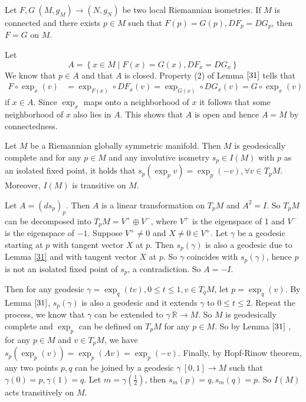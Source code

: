 \eproof
\begin{corollary}\label{11.2}
Let $F, G\:\left( M, g_{M} \right) \rightarrow \left( N, g_{N}
\right)$ be two local Riemannian isometries. If $M$ is connected
and there exists $p \in M$ such that $F(p) = G(p), D F_{p} = D
G_{p}$, then
$F=G$ on $M$.	
\end{corollary}
\bproof
Let
\[
A=\left\{ x \in M \mid F(x) = G(x), D F_{x} = D G_{x} \right\}
\]
We know that $p \in A$ and that $A$ is closed. Property (2) of
Lemma $\ref{31}$ tells
that
\[
\begin{aligned}
	F \circ \exp _{x}(v) & = \exp _{F(x)} \circ D F_{x}(v) =\exp
	_{G(x)} \circ D G_{x}(v) = G \circ \exp _{x}(v)
\end{aligned}
\]
if $x \in A$. Since $\exp _{x}$ maps onto a neighborhood of $x$
it follows that some
neighborhood of $x$ also lies in $A$. This shows that $A$ is open
and hence 
$A=M$ by connectedness.
\eproof

\begin{theorem}
	Let $M$ be a Riemannian globally symmetric manifold. Then $M$
	is geodesically complete and for any $p \in M$ and any
	involutive isometry $s_{p} \in I(M)$ with $p$ as an isolated
	fixed point, it holds that $s_{p}\left( \exp _{p} v
	\right)=\exp _{p}(-v), \forall v \in T_{p} M$.
	Moreover, $I(M)$ is transitive on $M$.
\end{theorem}
\bproof
Let $A=\left( d s_{p} \right)_{p}$. Then $A$ is a linear
transformation on $T_{p} M$ and $A^{2}=I$. So $T_{p} M$ can be
decomposed into $T_{p} M = V^{+} \oplus V^{-}$, where $V^{+}$ is
the eigenspace of 1 and $V^{-}$ is the eigenspace of $-1 .$
Suppose $V^{+} \neq 0$ and
$X \neq 0 \in V^{+}$. Let $\gamma$ be a geodesic starting at $p$
with tangent vector $X$ at $p$.
Then $s_{p}(\gamma)$ is also a geodesic due to Lemma \ref{31} and
with tangent vector $X$ at $p$. So $\gamma$ coincides with
$s_{p}(\gamma)$, hence $p$ is not an isolated fixed point of
$s_{p}$,
a contradiction. So $A=-I .$

Then for any geodesic $\gamma = \exp _{q}(t v), 0 \leq t \leq 1,
v \in T_{q} M$, let $p = \exp _{q}(v) .$ By
Lemma $\ref{31}$, $s_{p}(\gamma)$ is also a geodesic and it
extends $\gamma$ to $0 \leq t \leq 2$. Repeat the process, we
know that $\gamma$ can be extended to $\gamma\: \mathbb{R}
\rightarrow M .$ So $M$ is geodesically complete and $\exp _{p}$
can be defined on $T_{p} M$ for any $p \in M$. So by Lemma
$\ref{31}$ , for any $p \in M$ and $v \in T_{p} M$, we have
$s_{p}\left( \exp _{p}(v) \right)=\exp _{p}(A v)=\exp _{p}(-v)$.
Finally, by Hopf-Rinow theorem, any two points $p, q$ can be
joined by a geodesic $\gamma\:[0,1] \rightarrow M$ such that
$\gamma(0) = p, \gamma(1) = q$. Let $m=\gamma\left( \frac{1}{2}
\right)$, then $s_{m}(p)=q, s_{m}(q)=p .$ So $I(M)$ acts
transitively on $M$.
\eproof


